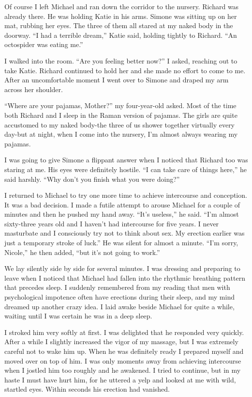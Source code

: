 \documentclass[]{article}
\begin{document}
Of course I left Michael and ran down the corridor to the nursery. Richard was already there. He was holding Katie in his arms. Simone was sitting up on her mat, rubbing her eyes. The three of them all stared at my naked body in the doorway. “I had a terrible dream,” Katie said, holding tightly to Richard. “An octospider was eating me.”

I walked into the room. “Are you feeling better now?” I asked, reaching out to take Katie. Richard continued to hold her and she made no effort to come to me. After an uncomfortable moment I went over to Simone and draped my arm across her shoulder.

“Where are your pajamas, Mother?” my four-year-old asked. Most of the time both Richard and I sleep in the Raman version of pajamas. The girls are quite accustomed to my naked body-the three of us shower together virtually every day-but at night, when I come into the nursery, I’m almost always wearing my pajamas.

I was going to give Simone a flippant answer when I noticed that Richard too was staring at me. His eyes were definitely hostile. “I can take care of things here,” he said harshly. “Why don’t you finish what you were doing?”

I returned to Michael to try one more time to achieve intercourse and conception. It was a bad decision. I made a futile attempt to arouse Michael for a couple of minutes and then he pushed my hand away. “It’s useless,” he said. “I’m almost sixty-three years old and I haven’t had intercourse for five years. I never masturbate and I consciously try not to think about sex. My erection earlier was just a temporary stroke of luck.” He was silent for almost a minute. “I’m sorry, Nicole,” he then added, “but it’s not going to work.”

We lay silently side by side for several minutes. I was dressing and preparing to leave when I noticed that Michael had fallen into the rhythmic breathing pattern that precedes sleep. I suddenly remembered from my reading that men with psychological impotence often have erections during their sleep, and my mind dreamed up another crazy idea. I laid awake beside Michael for quite a while, waiting until I was certain he was in a deep sleep.

I stroked him very softly at first. I was delighted that he responded very quickly. After a while I slightly increased the vigor of my massage, but I was extremely careful not to wake him up. When he was definitely ready I prepared myself and moved over on top of him. I was only moments away from achieving intercourse when I jostled him too roughly and he awakened. I tried to continue, but in my haste I must have hurt him, for he uttered a yelp and looked at me with wild, startled eyes. Within seconds his erection had vanished.
\end{document}
